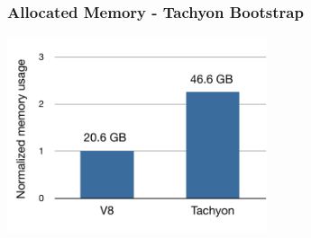 \begin{frame}
\frametitle{\bf Allocated Memory - Tachyon Bootstrap}

\begin{center}
\includegraphics[width=3in]{images/perf-bootstrap-mem}
\end{center}
\end{frame}
